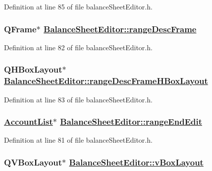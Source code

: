 Definition at line 85 of file balance\-Sheet\-Editor.h.\hypertarget{classBalanceSheetEditor_r25}{
\subsubsection[rangeDescFrame]{\setlength{\rightskip}{0pt plus 5cm}QFrame$\ast$ \hyperlink{classBalanceSheetEditor_r25}{Balance\-Sheet\-Editor::range\-Desc\-Frame}}}
\label{classBalanceSheetEditor_r25}


Definition at line 82 of file balance\-Sheet\-Editor.h.\hypertarget{classBalanceSheetEditor_r26}{
\subsubsection[rangeDescFrameHBoxLayout]{\setlength{\rightskip}{0pt plus 5cm}QHBox\-Layout$\ast$ \hyperlink{classBalanceSheetEditor_r26}{Balance\-Sheet\-Editor::range\-Desc\-Frame\-HBox\-Layout}}}
\label{classBalanceSheetEditor_r26}


Definition at line 83 of file balance\-Sheet\-Editor.h.\hypertarget{classBalanceSheetEditor_r24}{
\subsubsection[rangeEndEdit]{\setlength{\rightskip}{0pt plus 5cm}\hyperlink{classAccountList}{Account\-List}$\ast$ \hyperlink{classBalanceSheetEditor_r24}{Balance\-Sheet\-Editor::range\-End\-Edit}}}
\label{classBalanceSheetEditor_r24}


Definition at line 81 of file balance\-Sheet\-Editor.h.\hypertarget{classBalanceSheetEditor_r8}{
\subsubsection[vBoxLayout]{\setlength{\rightskip}{0pt plus 5cm}QVBox\-Layout$\ast$ \hyperlink{classBalanceSheetEditor_r3}{Balance\-Sheet\-Editor::v\-Box\-Layout}}}
\label{classBalanceSheetEditor_r8}


